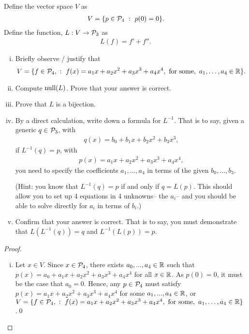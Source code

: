 \begin{question}\label{que:PrimePlusPrimePrime}
    \normalfont
    Define the vector space $V$ as
    \begin{align*}
        V = \{ p\in\P_4\ :\ p(0)=0 \}.
    \end{align*}
    Define the function, $L:V\to\P_3$ as
    \begin{align*}
        L(f) = f'+f''.
    \end{align*}

    \begin{enumerate}[(i)]
        \item Briefly observe / justify that
              \begin{align*}
                  V = \{ f\in\P_4,\ :\ f(x) = a_1x + a_2x^2 +a_3x^3 + a_4 x^4,\ \text{for some},\ a_1,\dots,a_4 \in\real\}.
              \end{align*}

        \item Compute $\NullLA(L)$.  Prove that your answer is correct.

        \item Prove that $L$ is a bijection.

        \item By a direct calculation, write down a formula for $L^{-1}$.  That is to say, given a generic $q\in \P_3$, with
              \begin{align*}
                  q(x)= b_0 + b_1x + b_2x^2 + b_3x^3,
              \end{align*}
              if $L^{-1}(q)=p$, with
              \begin{align*}
                  p(x) = a_1x + a_2x^2 +a_3x^3 + a_4 x^4,
              \end{align*}
              you need to specify the coefficients $a_1,\dots, a_4$ in terms of the given $b_0,\dots, b_3$.

              (Hint: you know that $L^{-1}(q)=p$ if and only if $q=L(p)$.  This should allow you to set up 4 equations in 4 unknowns-- the $a_i$-- and you should be able to solve directly for $a_i$ in terms of $b_i$.)

        \item Confirm that your answer is correct.  That is to say, you must demonstrate that $L(L^{-1}(q))=q$ and $L^{-1}(L(p))=p$.

    \end{enumerate}
\end{question}

\begin{proof}
    \renewcommand{\qedsymbol}{$\blacksquare$}
    \begin{enumerate}[(i)]
        \item Let $x\in V$. Since $x\in\P_4$, there exists $a_0,...,a_4\in\R$ such that $p(x)=a_0+a_1x+a_2x^2+a_3x^3+a_4x^4$ for all $x\in\R$.
        As $p(0)=0$, it must be the case that $a_0=0$. Hence, any $p\in\P_4$ must satisfy $p(x)=a_1x+a_2x^2+a_3x^3+a_4x^4$ for some $a_1,...,a_4\in\R$,
        or $V=\{f\in\P_4,\ :\ f(x) = a_1x + a_2x^2 +a_3x^3 + a_4 x^4,\ \text{for some},\ a_1,\dots,a_4 \in\real\}$.\qed
    \end{enumerate}
    \renewcommand{\qedsymbol}{}
\end{proof}